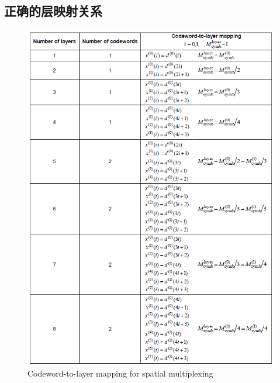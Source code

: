 \documentclass{article}
\begin{document}
\subsection{正确的层映射关系}
\begin{figure}[H]
	\centering
	\includegraphics[width = .9\textwidth]{table.png}
	\caption{Codeword-to-layer mapping for spatial multiplexing}
\end{figure}
\end{document}
